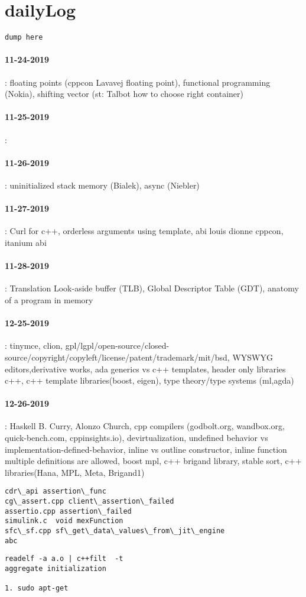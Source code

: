 \section{dailyLog} 
\begin{verbatim}
dump here
\end{verbatim}

\paragraph{11-24-2019}: floating points (cppcon Lavavej floating point), functional programming (Nokia), shifting vector (st: Talbot how to choose right container)
\paragraph{11-25-2019}:
\paragraph{11-26-2019}: uninitialized stack memory (Bialek), async (Niebler) 
\paragraph{11-27-2019}: Curl for c++, orderless arguments using template, abi louis dionne cppcon, itanium abi
\paragraph{11-28-2019}: Translation Look-aside buffer (TLB), Global Descriptor Table (GDT), anatomy of a program in memory 
\paragraph{12-25-2019}: tinymce, clion, gpl/lgpl/open-source/closed-source/copyright/copyleft/license/patent/trademark/mit/bsd, WYSWYG editors,derivative works, ada generics vs c++ templates, header only libraries c++, c++ template libraries(boost, eigen), type theory/type systems
(ml,agda)
\paragraph{12-26-2019}: Haskell B. Curry, Alonzo Church, cpp compilers (godbolt.org, wandbox.org, quick-bench.com, cppinsights.io), devirtualization,
undefined behavior vs implementation-defined-behavior, inline vs outline constructor, inline function multiple definitions are allowed, 
boost mpl, c++ brigand library, stable sort, c++ libraries(Hana, MPL, Meta, Brigand1)
\begin{verbatim}
cdr\_api assertion\_func
cg\_assert.cpp client\_assertion\_failed 
assertio.cpp assertion\_failed
simulink.c  void mexFunction
sfc\_sf.cpp sf\_get\_data\_values\_from\_jit\_engine
abc
\end{verbatim}

\begin{verbatim}
readelf -a a.o | c++filt  -t
aggregate initialization

1. sudo apt-get
\end{verbatim}

